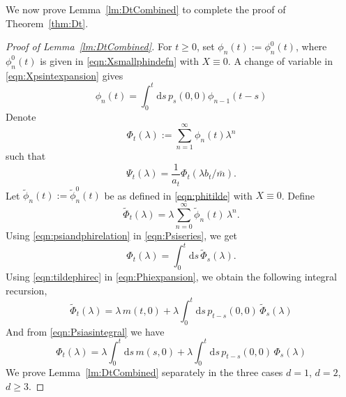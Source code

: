 \documentclass{article}[12pt]
\theoremstyle{definition}
\newcommand{\1}{\mathbbm{1}}
\newcommand{\dd }{\mathrm{d} }
\begin{document}
We now prove Lemma~\ref{lm:DtCombined} to complete the proof of Theorem~\ref{thm:Dt}.
\begin{proof}[Proof of Lemma~\ref{lm:DtCombined}]
For $t\ge 0$, set $\phi_n(t) := \phi^0_n(t)$, where $\phi^0_n(t)$ is given in \eqref{eqn:Xsmallphindefn} with $X\equiv 0$. 
A change of variable in \eqref{eqn:Xpsintexpansion} gives
\begin{equation}
    \phi_n(t) = \int_0^t \dd s\, p_s(0,0)\phi_{n-1}(t-s)
    \label{eqn:phinintrec}
\end{equation}
Denote
\begin{equation}
    \Phi_t(\lambda) := \sum_{n=1}^\infty \phi_n(t)\lambda^n
    \label{eqn:Psiseries}
\end{equation}
such that 
\begin{equation}
    \Psi_t(\lambda) = \frac{1}{a_t}\Phi_t(\lambda b_t/\bar{m}).
\end{equation}
Let $\tilde{\phi}_n(t):=\tilde{\phi}^0_n(t)$ be as defined in \eqref{eqn:phitilde}
with $X\equiv 0$.
Define
\begin{equation}
  \tilde{\Phi}_t(\lambda) = \lambda\sum_{n=0}^\infty \tilde{\phi}_n(t)\,\lambda^n.
    \label{eqn:Phiexpansion}
\end{equation}
Using \eqref{eqn:psiandphirelation} in \eqref{eqn:Psiseries}, we get 
\begin{equation}
    \Phi_t(\lambda) = \int_0^t \dd s\, \tilde{\Phi}_s(\lambda).
    \label{eqn:Psiasintegral}
\end{equation}
Using \eqref{eqn:tildephirec} in \eqref{eqn:Phiexpansion}, we obtain the following integral recursion,
\begin{equation}
   \tilde{\Phi}_t(\lambda) = \lambda \,m(t,0) +\lambda \int_{0}^t \dd s\, p_{t-s}(0,0)\,\tilde{\Phi}_s(\lambda)
    \label{eqn:tildePhirecursion}
\end{equation}
And from \eqref{eqn:Psiasintegral} we have 
\begin{equation}
  {\Phi}_t(\lambda) = \lambda \int_0^t\dd s\,m(s,0) +\lambda \int_{0}^t \dd s\, p_{t-s}(0,0)\,{\Phi}_s(\lambda)
    \label{eqn:Phirecursion}
\end{equation}
We prove Lemma~\ref{lm:DtCombined} separately in the three cases $d=1$, $d=2$, $d\ge 3$. 

\end{proof}
\end{document}
